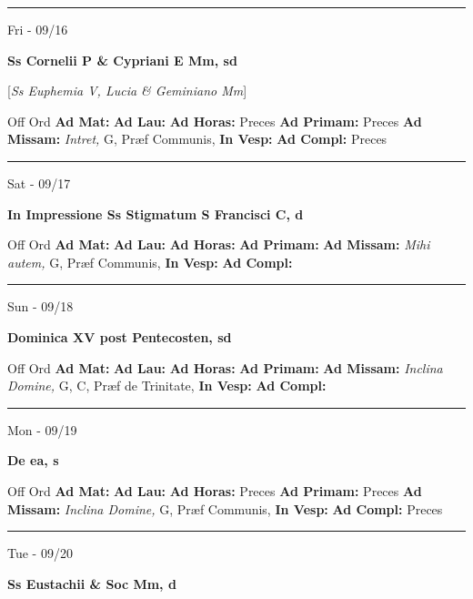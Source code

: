 \documentclass[letterpaper, 10pt]{article}
\begin{document}
\hrule
\begin{center}
Fri - 09/16
\end{center}\textbf{ \large Ss Cornelii P \& Cypriani E Mm, \textnormal{\normalsize sd}}

[\textit{Ss Euphemia V, Lucia \& Geminiano Mm}]
\begin{justify}
Off Ord
\textbf{Ad Mat: }
\textbf{Ad Lau: }
\textbf{Ad Horas: }Preces
\textbf{Ad Primam: }Preces
\textbf{Ad Missam:} \textit{Intret, } G, Præf Communis, 
\textbf{In Vesp: }
\textbf{Ad Compl: }Preces\end{justify}



\hrule
\begin{center}
Sat - 09/17
\end{center}\textbf{ \large In Impressione Ss Stigmatum S Francisci C, \textnormal{\normalsize d}}
\begin{justify}
Off Ord
\textbf{Ad Mat: }
\textbf{Ad Lau: }
\textbf{Ad Horas: }
\textbf{Ad Primam: }
\textbf{Ad Missam:} \textit{Mihi autem, } G, Præf Communis, 
\textbf{In Vesp: }
\textbf{Ad Compl: }\end{justify}



\hrule
\begin{center}
Sun - 09/18
\end{center}\textbf{ \large Dominica XV post Pentecosten, \textnormal{\normalsize sd}}
\begin{justify}
Off Ord
\textbf{Ad Mat: }
\textbf{Ad Lau: }
\textbf{Ad Horas: }
\textbf{Ad Primam: }
\textbf{Ad Missam:} \textit{Inclina Domine, } G, C, Præf de Trinitate, 
\textbf{In Vesp: }
\textbf{Ad Compl: }\end{justify}



\hrule
\begin{center}
Mon - 09/19
\end{center}\textbf{ \large De ea, \textnormal{\normalsize s}}
\begin{justify}
Off Ord
\textbf{Ad Mat: }
\textbf{Ad Lau: }
\textbf{Ad Horas: }Preces
\textbf{Ad Primam: }Preces
\textbf{Ad Missam:} \textit{Inclina Domine, } G, Præf Communis, 
\textbf{In Vesp: }
\textbf{Ad Compl: }Preces\end{justify}



\hrule
\begin{center}
Tue - 09/20
\end{center}\textbf{ \large Ss Eustachii \& Soc Mm, \textnormal{\normalsize d}}
\end{document}
